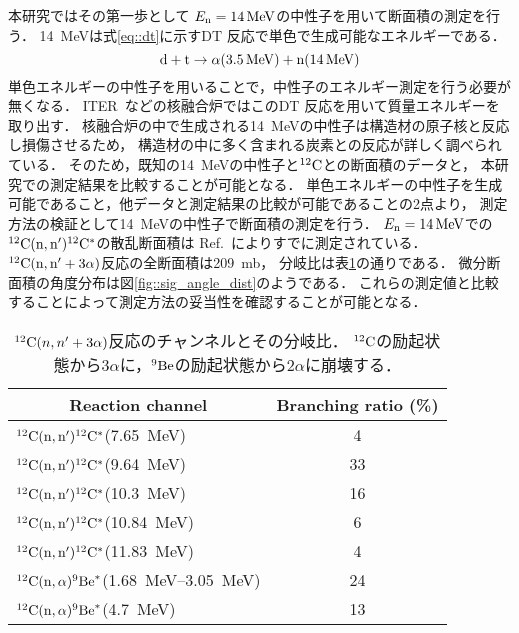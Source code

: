 \documentclass[../master]{subfiles}
\begin{document}
本研究ではその第一歩として
$E_{\rm n} = \SI{14}{\mega\electronvolt}$の中性子を用いて断面積の測定を行う．
\SI{14}{\mega\electronvolt}は式\eqref{eq::dt}に示すDT 反応で単色で生成可能なエネルギーである．
\begin{equation}
  {\rm d} + {\rm t} \rightarrow \alpha (\SI{3.5}{\mega\electronvolt}) + {\rm n} (\SI{14}{\mega\electronvolt})
  \label{eq::dt}
\end{equation}
単色エネルギーの中性子を用いることで，中性子のエネルギー測定を行う必要が無くなる．
ITER~\cite{iter}などの核融合炉ではこのDT 反応を用いて質量エネルギーを取り出す．
核融合炉の中で生成される\SI{14}{\mega\electronvolt}の中性子は構造材の原子核と反応し損傷させるため，
構造材の中に多く含まれる炭素との反応が詳しく調べられている．
そのため，既知の\SI{14}{\mega\electronvolt}の中性子と${}^{12}{\rm C}$との断面積のデータと，
本研究での測定結果を比較することが可能となる．
単色エネルギーの中性子を生成可能であること，他データと測定結果の比較が可能であることの2点より，
測定方法の検証として\SI{14}{\mega\electronvolt}の中性子で断面積の測定を行う．
$E_{\rm n}=\SI{14}{\mega\electronvolt}$での${}^{12}{\rm C}({\rm n},{\rm n}'){}^{12}{\rm C}^{*}$の散乱断面積は
Ref.~\cite{takahashietal,kondoetal}によりすでに測定されている．
${}^{12}{\rm C}({\rm n},{\rm n}'+3\alpha)$反応の全断面積は\SI{209}{\milli\barn}，
分岐比は表\ref{tab::branchingratio}の通りである．
微分断面積の角度分布は図\ref{fig::sig_angle_dist}のようである．
これらの測定値と比較することによって測定方法の妥当性を確認することが可能となる．

\begin{table}
  \centering
  \caption[${}^{12}{\rm C}(n,n'+3\alpha)$反応のチャンネルとその分岐比．]
          {${}^{12}{\rm C}(n,n'+3\alpha)$反応のチャンネルとその分岐比．
  ${}^{12}{\rm C}$の励起状態から$3\alpha$に，${}^{9}{\rm Be}$の励起状態から$2\alpha$に崩壊する．}
  \label{tab::branchingratio}
  \begin{tabular}{lc}
    \toprule
    \multicolumn{1}{c}{Reaction channel} & Branching ratio (\%)\\
    \midrule
    ${}^{12}{\rm C}({\rm n},{\rm n}'){}^{12}{\rm C}^{*}$(\SI{7.65}{\mega\electronvolt}) & 4\\
    ${}^{12}{\rm C}({\rm n},{\rm n}'){}^{12}{\rm C}^{*}$(\SI{9.64}{\mega\electronvolt}) & 33\\
    ${}^{12}{\rm C}({\rm n},{\rm n}'){}^{12}{\rm C}^{*}$(\SI{10.3}{\mega\electronvolt}) & 16\\
    ${}^{12}{\rm C}({\rm n},{\rm n}'){}^{12}{\rm C}^{*}$(\SI{10.84}{\mega\electronvolt}) & 6\\
    ${}^{12}{\rm C}({\rm n},{\rm n}'){}^{12}{\rm C}^{*}$(\SI{11.83}{\mega\electronvolt}) & 4\\
    ${}^{12}{\rm C}({\rm n},\alpha){}^{9}{\rm Be}^{*}$(\SIrange{1.68}{3.05}{\mega\electronvolt}) & 24\\
    ${}^{12}{\rm C}({\rm n},\alpha){}^{9}{\rm Be}^{*}$(\SI{4.7}{\mega\electronvolt}) & 13\\
    \bottomrule
  \end{tabular}
\end{table}
\end{document}
